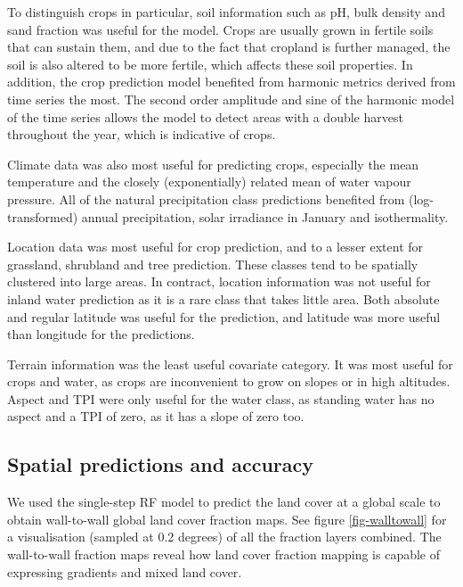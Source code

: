 \documentclass[a4paper,10pt]{article}
\begin{document}
To distinguish crops in particular, soil information such as pH, bulk density and sand fraction was useful for the model.
Crops are usually grown in fertile soils that can sustain them, and due to the fact that cropland is further managed, the soil is also altered to be more fertile, which affects these soil properties.
In addition, the crop prediction model benefited from harmonic metrics derived from time series the most.
The second order amplitude and sine of the harmonic model of the time series allows the model to detect areas with a double harvest throughout the year, which is indicative of crops.

Climate data was also most useful for predicting crops, especially the mean temperature and the closely (exponentially) related mean of water vapour pressure.
All of the natural precipitation class predictions benefited from (log-transformed) annual precipitation, solar irradiance in January and isothermality.

Location data was most useful for crop prediction, and to a lesser extent for grassland, shrubland and tree prediction.
These classes tend to be spatially clustered into large areas.
In contract, location information was not useful for inland water prediction as it is a rare class that takes little area.
Both absolute and regular latitude was useful for the prediction, and latitude was more useful than longitude for the predictions.

Terrain information was the least useful covariate category.
It was most useful for crops and water, as crops are inconvenient to grow on slopes or in high altitudes.
Aspect and \gls{TPI} were only useful for the water class, as standing water has no aspect and a \gls{TPI} of zero, as it has a slope of zero too.

\subsection{Spatial predictions and accuracy}

We used the single-step \gls{RF} model to predict the land cover at a global scale to obtain wall-to-wall global land cover fraction maps.
See figure \ref{fig-walltowall} for a visualisation (sampled at 0.2 degrees) of all the fraction layers combined.
The wall-to-wall fraction maps reveal how land cover fraction mapping is capable of expressing gradients and mixed land cover.
\end{document}
